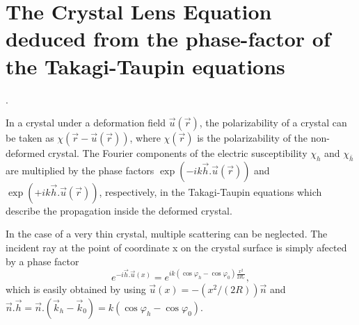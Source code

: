 \documentclass[preprint]{iucr}              %
\begin{document}


\appendix
\section{The Crystal Lens Equation deduced from the phase-factor of the Takagi-Taupin equations}
\label{appendix:CLE}.

In a crystal under a deformation field $\vec u(\vec r)$, the polarizability of a crystal can be taken as $\chi(\vec r-\vec u(\vec r))$, where $\chi(\vec r)$ is the polarizability of the non-deformed crystal. The Fourier components of the electric susceptibility $\chi_h$ and $\chi_{\bar h}$ are multiplied by the phase factors $\exp(-i k \vec h . \vec u (\vec r))$ and $\exp(+i k \vec h . \vec u (\vec r))$, respectively, in the Takagi-Taupin equations which describe  the propagation inside the deformed crystal.

In the case of a very thin crystal, multiple scattering can be neglected. The incident ray at the point of coordinate x on the crystal surface is simply afected by a phase factor 
\begin{equation}
    e^{-i \vec h . \vec u(x)} = e^{i k (\cos\varphi_h-\cos\varphi_0) \frac{x^2}{2 R_c} },
\end{equation}
which is easily obtained by using $\vec u(x) = -(x^2/(2R))\vec n$ and $\vec n . \vec h = \vec n.(\vec k_h - \vec k_0) = k(\cos\varphi_h-\cos\varphi_0)$. 
\end{document}

